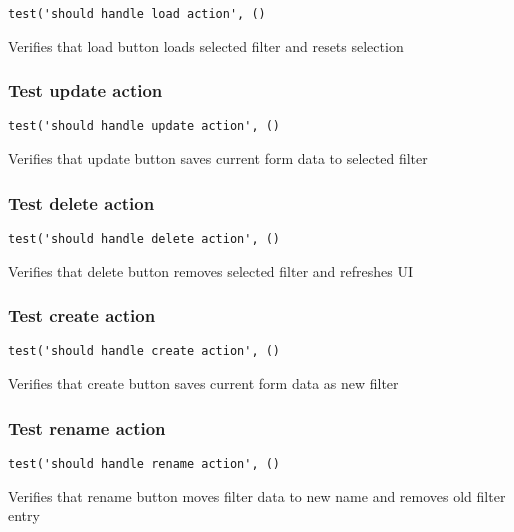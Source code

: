 \documentclass[a4paper]{article}
\begin{document}
\begin{lstlisting}
test('should handle load action', ()
\end{lstlisting}

Verifies that load button loads selected filter and resets selection

\hypertarget{toc604}{}
\subsubsection{Test update action}

\begin{lstlisting}
test('should handle update action', ()
\end{lstlisting}

Verifies that update button saves current form data to selected filter

\hypertarget{toc605}{}
\subsubsection{Test delete action}

\begin{lstlisting}
test('should handle delete action', ()
\end{lstlisting}

Verifies that delete button removes selected filter and refreshes UI

\hypertarget{toc606}{}
\subsubsection{Test create action}

\begin{lstlisting}
test('should handle create action', ()
\end{lstlisting}

Verifies that create button saves current form data as new filter

\hypertarget{toc607}{}
\subsubsection{Test rename action}

\begin{lstlisting}
test('should handle rename action', ()
\end{lstlisting}

Verifies that rename button moves filter data to new name
and removes old filter entry

\hypertarget{toc608}{}
\end{document}
